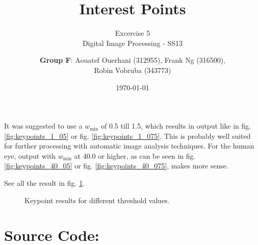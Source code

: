 \documentclass[a4paper,headings=small]{scrartcl}
\title{Interest Points}
\subtitle{Excercise 5 \\ Digital Image Processing - SS13}
\author{\textbf{Group F}: Aouatef Ouerhani (312955), Frank Ng (316500),\\ Robin Vobruba (343773)}
\date{\today}
\numberwithin{equation}{section} %
\numberwithin{figure}{section}   %
\newcommand{\imgGeneratedRoot}{../../../target}
\begin{document}
\maketitle

It was suggested to use a $w_{\text{min}}$ of 0.5 till 1.5,
which results in output like in
fig. \ref{fig:keypoints_1_05} or
fig. \ref{fig:keypoints_1_075}.
This is probably well suited for further processing with automatic image analysis techniques.
For the human eye, output with $w_{\text{min}}$ at 40.0 or higher,
as can be seen in
fig. \ref{fig:keypoints_40_05} or
fig. \ref{fig:keypoints_40_075},
makes more sense.

See all the result in fig. \ref{fig:keypoints}.


\begin{figure}[htp]
	\centering




	\caption{
		Keypoint results for different threshold values.
	}
	\label{fig:keypoints}
\end{figure}


\newpage
\section{Source Code:}


\end{document}
